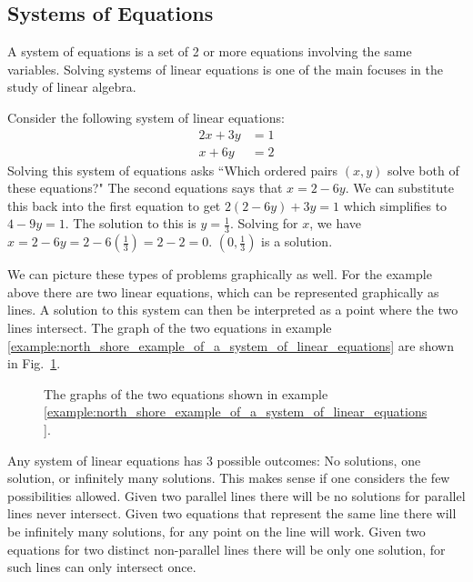 \documentclass[crop=false,class=book,oneside]{standalone}
\begin{document}
        \subsection{Systems of Equations}
            A system of equations is a set of 2 or more equations involving the same variables. Solving systems of linear equations is one of the main focuses in the study of linear algebra.
            \begin{example}
            \label{example:north_shore_example_of_a_system_of_linear_equations}Consider the following system of linear equations:
            \begin{align*}
                2x+3y&=1\\
                x+6y&=2
            \end{align*}
            Solving this system of equations asks ``Which ordered pairs $(x,y)$ solve both of these equations?" The second equations says that $x=2-6y$. We can substitute this back into the first equation to get $2(2-6y)+3y=1$ which simplifies to $4-9y=1$. The solution to this is $y=\frac{1}{3}$. Solving for $x$, we have $x=2-6y=2-6(\frac{1}{3})=2-2=0$. $(0,\frac{1}{3})$ is a solution.
            \end{example}
            We can picture these types of problems graphically as well. For the example above there are two linear equations, which can be represented graphically as lines. A solution to this system can then be interpreted as a point where the two lines intersect. The graph of the two equations in example \ref{example:north_shore_example_of_a_system_of_linear_equations} are shown in Fig.~\ref{fig:north_shore_systems_of_linear_equations}.
            \begin{figure}[H]
                \centering
                \captionsetup{type=figure}

                \caption{The graphs of the two equations shown in example \ref{example:north_shore_example_of_a_system_of_linear_equations}.}
                \label{fig:north_shore_systems_of_linear_equations}
            \end{figure}
            Any system of linear equations has 3 possible outcomes: No solutions, one solution, or infinitely many solutions. This makes sense if one considers the few possibilities allowed. Given two parallel lines there will be no solutions for parallel lines never intersect. Given two equations that represent the same line there will be infinitely many solutions, for any point on the line will work. Given two equations for two distinct non-parallel lines there will be only one solution, for such lines can only intersect once.
\end{document}
